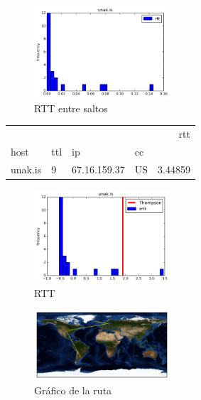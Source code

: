 \begin{figure}[H]
  \centering
    \includegraphics[width=0.45\textwidth]{histogramas_rtt/unak-is.png}
  \caption{RTT entre saltos}
  \label{entropia-s}
\end{figure}

\begin{center}
\begin{tabular}{llllr}
\toprule
        &    &               &    &      rtt \\
host & ttl & ip & cc &          \\
\midrule
unak.is & 9  & 67.16.159.37 & US &  3.44859 \\
\bottomrule
\end{tabular}
\end{center}

\begin{figure}[H]
  \centering
    \includegraphics[width=0.45\textwidth]{histogramas_thompson/unak-is.png}
  \caption{RTT }
  \label{entropia-s}
\end{figure}

\begin{figure}[H]
  \centering
    \includegraphics[width=0.45\textwidth]{grafico-rutas/unak-is.png}
  \caption{Gráfico de la ruta}
  \label{entropia-s}
\end{figure}



